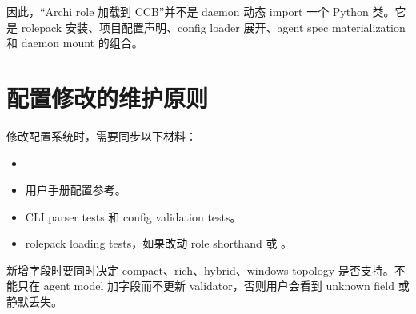 因此，“Archi role 加载到 CCB”并不是 daemon 动态 import 一个 Python 类。它是 rolepack 安装、项目配置声明、config loader 展开、agent spec materialization 和 daemon mount 的组合。

\section{配置修改的维护原则}

修改配置系统时，需要同步以下材料：

\begin{itemize}
  \item {}
  \item 用户手册配置参考。
  \item CLI parser tests 和 config validation tests。
  \item rolepack loading tests，如果改动 role shorthand 或 。
\end{itemize}

新增字段时要同时决定 compact、rich、hybrid、windows topology 是否支持。不能只在 agent model 加字段而不更新 validator，否则用户会看到 unknown field 或静默丢失。
